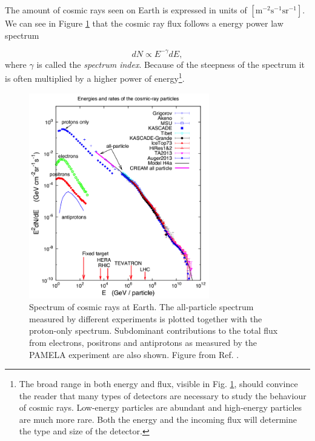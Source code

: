 The amount of cosmic rays seen on Earth is expressed in units of $\left[\textrm{m}^{-2} \textrm{s}^{-1} \textrm{sr}^{-1}\right]$. We can see in Figure \ref{fig:spectrumCR} that the cosmic ray flux follows a energy power law spectrum

\begin{equation}
\label{eq:spectrum}
dN \varpropto E^{-\gamma} dE,
\end{equation} 
where $\gamma$ is called the \textit{spectrum index}. Because of the steepness of the spectrum it is often multiplied by a higher power of energy\footnote{The broad range in both energy and flux, visible in Fig. \ref{fig:spectrumCR}, should convince the reader that many types of detectors are necessary to study the behaviour of cosmic rays. Low-energy particles are abundant and high-energy particles are much more rare. Both the energy and the incoming flux will determine the type and size of the detector.}.

\begin{figure}
\centering
\includegraphics[width = 0.7\textwidth]{chapter3/img/spectrumCR.png}
\caption{Spectrum of cosmic rays at Earth. The all-particle spectrum measured by different experiments is plotted together with the proton-only spectrum. Subdominant contributions to the total flux from electrons, positrons and antiprotons as measured by the PAMELA experiment are also shown. Figure from Ref. \cite{Blasi:2013rva}.}
\label{fig:spectrumCR}
\end{figure}

